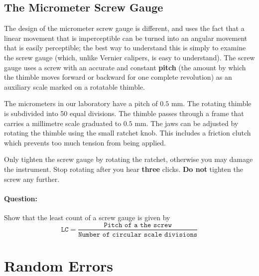 \subsection{The Micrometer Screw Gauge}

The design of the micrometer screw gauge is different, and uses the fact that a linear movement that is imperceptible can be turned into an angular movement that is easily perceptible; the best way to understand this is simply to examine the screw gauge (which, unlike Vernier calipers, is easy to understand). The screw gauge uses a screw with an accurate and constant \textbf{pitch} (the amount by which the thimble moves forward or backward for one complete revolution) as an auxiliary scale marked on a rotatable thimble.  

The micrometers in our laboratory have a pitch of $0.5$ $\mathrm{mm}$.  The rotating thimble is subdivided into 50 equal divisions.  The thimble passes through a frame that carries a millimetre scale graduated to $0.5$ $\mathrm{mm}$.  The jaws can be adjusted by rotating the thimble using the small ratchet knob.  This includes a friction clutch which prevents too much tension from being applied.

\begin{imp}
Only tighten the screw gauge by rotating the ratchet, otherwise you may damage the instrument. Stop rotating after you hear \textbf{three} clicks. \textbf{Do not} tighten the screw any further.
\end{imp}

\begin{question}
\paragraph{Question:} Show that the least count of a screw gauge is given by
$$\texttt{LC} = \frac{\texttt{Pitch of a the screw}}{\texttt{Number of circular scale divisions}}$$
\end{question}

\section{Random Errors}

